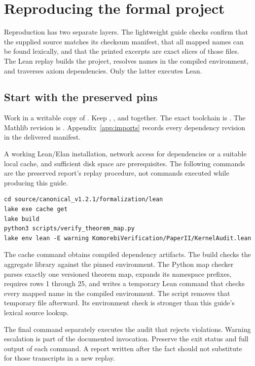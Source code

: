 \section{Reproducing the formal project}\label{sec:replay}

Reproduction has two separate layers. The lightweight guide checks confirm that the supplied source matches its checksum manifest, that all mapped names can be found lexically, and that the printed excerpts are exact slices of those files. The Lean replay builds the project, resolves names in the compiled environment, and traverses axiom dependencies. Only the latter executes Lean.

\subsection{Start with the preserved pins}

Work in a writable copy of . Keep , , and  together. The exact toolchain is . The Mathlib revision is . Appendix~\ref{app:imports} records every dependency revision in the delivered manifest.

A working Lean/Elan installation, network access for dependencies or a suitable local cache, and sufficient disk space are prerequisites. The following commands are the preserved report's replay procedure, not commands executed while producing this guide.
\begin{Verbatim}[fontsize=\small,frame=leftline,rulecolor=\color{teal},framesep=6pt,breaklines=true]
cd source/canonical_v1.2.1/formalization/lean
lake exe cache get
lake build
python3 scripts/verify_theorem_map.py
lake env lean -E warning KomorebiVerification/PaperII/KernelAudit.lean
\end{Verbatim}

The cache command obtains compiled dependency artifacts. The build checks the aggregate library against the pinned environment. The Python map checker parses exactly one versioned theorem map, expands its namespace prefixes, requires rows 1 through 25, and writes a temporary Lean command that checks every mapped name in the compiled environment. The script removes that temporary file afterward. Its environment check is stronger than this guide's lexical source lookup.

The final command separately executes the audit that rejects violations. Warning escalation is part of the documented invocation. Preserve the exit status and full output of each command. A report written after the fact should not substitute for those transcripts in a new replay.

